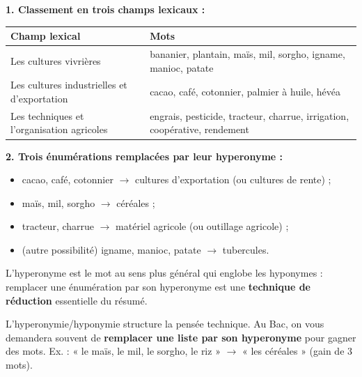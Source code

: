 \documentclass[11pt]{article}
\newcommand{\cle}[1]{{\popxbold\color{popdark}#1}}
\begin{document}
\begin{corrige}
\textbf{1. Classement en trois champs lexicaux :}

\begin{center}
\begin{tabularx}{\linewidth}{|l|X|}\hline
\rowcolor{popblueL} \textbf{Champ lexical} & \textbf{Mots} \\ \hline
Les cultures vivrières & bananier, plantain, maïs, mil, sorgho, igname, manioc, patate \\ \hline
Les cultures industrielles et d'exportation & cacao, café, cotonnier, palmier à huile, hévéa \\ \hline
Les techniques et l'organisation agricoles & engrais, pesticide, tracteur, charrue, irrigation, coopérative, rendement \\ \hline
\end{tabularx}
\end{center}

\textbf{2. Trois énumérations remplacées par leur hyperonyme :}
\begin{itemize}
    \item cacao, café, cotonnier $\rightarrow$ \cle{cultures d'exportation} (ou cultures de rente) ;
    \item maïs, mil, sorgho $\rightarrow$ \cle{céréales} ;
    \item tracteur, charrue $\rightarrow$ \cle{matériel agricole} (ou outillage agricole) ;
    \item (autre possibilité) igname, manioc, patate $\rightarrow$ \cle{tubercules}.
\end{itemize}

L'hyperonyme est le mot au sens plus général qui englobe les hyponymes : remplacer une énumération par son hyperonyme est une \textbf{technique de réduction} essentielle du résumé.
\end{corrige}

\begin{attention}
L'hyperonymie/hyponymie structure la pensée technique. Au Bac, on vous demandera souvent de \textbf{remplacer une liste par son hyperonyme} pour gagner des mots. Ex. : « le maïs, le mil, le sorgho, le riz » $\rightarrow$ « les céréales » (gain de 3 mots).
\end{attention}
\end{document}
